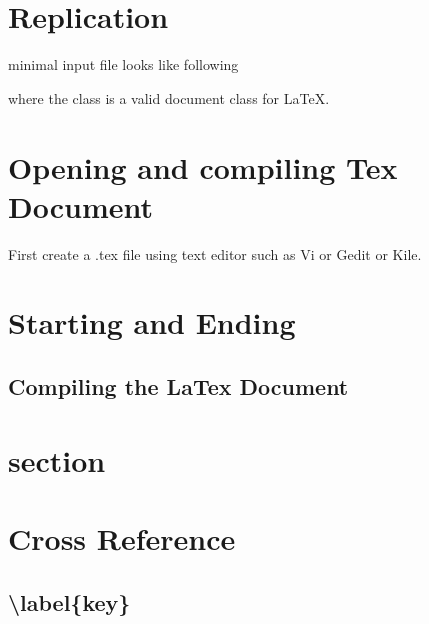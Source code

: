 \documentclass[11pt,a4paper]{article}
\begin{document}
\section{Replication}
 minimal input file looks like following\\ 

where the class is a valid document class for LaTeX.
\section{Opening and compiling Tex Document}
First create a .tex file using text editor such as Vi or Gedit or Kile.
\section{Starting and Ending}
\subsection{Compiling the LaTex Document{\normalfont}}
\section{section}
\section{Cross Reference}
\subsection{\textbackslash label\{key\}{\normalfont}}
\end{document}

